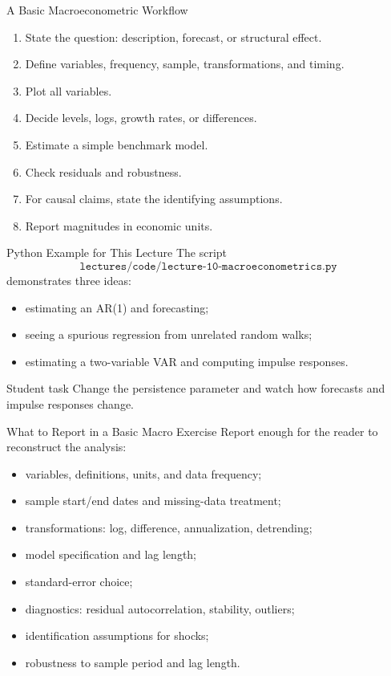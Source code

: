 \documentclass[11pt,aspectratio=169]{beamer}
\begin{document}
\begin{frame}{A Basic Macroeconometric Workflow}
  \begin{enumerate}
    \item State the question: description, forecast, or structural effect.
    \item Define variables, frequency, sample, transformations, and timing.
    \item Plot all variables.
    \item Decide levels, logs, growth rates, or differences.
    \item Estimate a simple benchmark model.
    \item Check residuals and robustness.
    \item For causal claims, state the identifying assumptions.
    \item Report magnitudes in economic units.
  \end{enumerate}
\end{frame}

\begin{frame}{Python Example for This Lecture}
  The script
  \[
    \texttt{lectures/code/lecture-10-macroeconometrics.py}
  \]
  demonstrates three ideas:
  \begin{itemize}
    \item estimating an AR(1) and forecasting;
    \item seeing a spurious regression from unrelated random walks;
    \item estimating a two-variable VAR and computing impulse responses.
  \end{itemize}

  \begin{block}{Student task}
    Change the persistence parameter and watch how forecasts and impulse responses change.
  \end{block}
\end{frame}

\begin{frame}{What to Report in a Basic Macro Exercise}
  Report enough for the reader to reconstruct the analysis:
  \begin{itemize}
    \item variables, definitions, units, and data frequency;
    \item sample start/end dates and missing-data treatment;
    \item transformations: log, difference, annualization, detrending;
    \item model specification and lag length;
    \item standard-error choice;
    \item diagnostics: residual autocorrelation, stability, outliers;
    \item identification assumptions for shocks;
    \item robustness to sample period and lag length.
  \end{itemize}
\end{frame}
\end{document}
